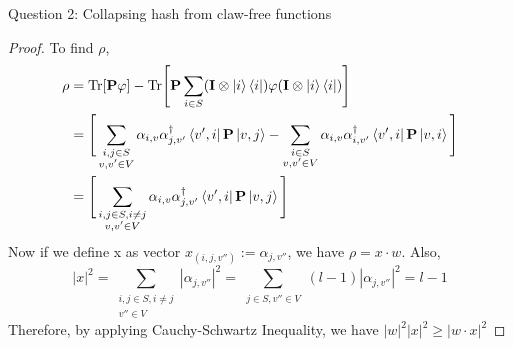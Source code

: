 \begin{solution}{Question 2: Collapsing hash from claw-free functions}
\begin{proof}
    To find $\rho$, 
    \begin{equation*}
        \begin{split}
            \rho &= \text{Tr}[\textbf{P}\varphi] - \text{Tr}\Bigg[\textbf{P}\sum_{i\in S}(\textbf{I}\otimes \ket{i}\bra{i})\varphi(\textbf{I}\otimes \ket{i}\bra{i})\Bigg]\\
            &= \Bigg[\sum\limits_{\substack{i,j\in S \\ v,v'\in V}} \alpha_{i,v}\alpha_{j,v'}^\dag \bra{v',i}\textbf{P}\ket{v,j} - \sum\limits_{\substack{i\in S \\ v,v'\in V}} \alpha_{i,v}\alpha_{i,v'}^\dag \bra{v',i}\textbf{P}\ket{v,i}\Bigg]\\
            &= \Bigg[\sum\limits_{\substack{i,j\in S, i\neq j \\ v,v'\in V}} \alpha_{i,v}\alpha_{j,v'}^\dag \bra{v',i}\textbf{P}\ket{v,j} \Bigg]
        \end{split}
    \end{equation*}
    Now if we define x as vector $x_(i,j,v'') := \alpha_{j,v''}$, we have $\rho = x\cdot w$. Also,
    \begin{equation*}
        |x|^2 = \sum\limits_{\substack{i,j\in S,i\neq j \\ v''\in V}} |\alpha_{j,v''}|^2 = \sum\limits_{\substack{j\in S, v''\in V}} (l-1) |\alpha_{j,v''}|^2 = l-1
    \end{equation*}
    Therefore, by applying Cauchy-Schwartz Inequality, we have $|w|^2|x|^2 \geq |w\cdot x|^2$
    \end{proof}
\end{solution}
